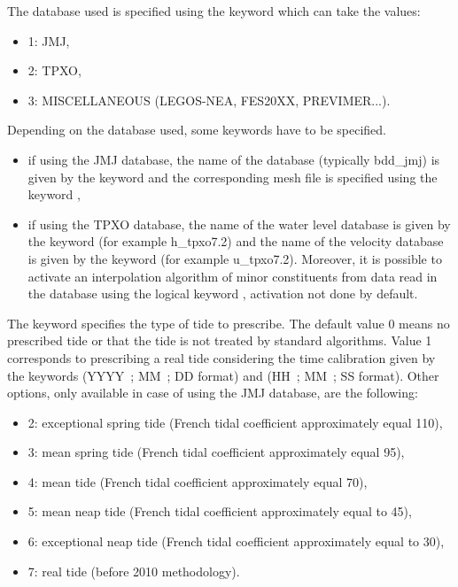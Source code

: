 The database used is specified using the keyword  which
can take the values:

\begin{itemize}
\item 1: JMJ,

\item 2: TPXO,

\item 3: MISCELLANEOUS (LEGOS-NEA, FES20XX, PREVIMER...).
\end{itemize}

Depending on the database used, some keywords have to be specified.

\begin{itemize}
\item if using the JMJ database, the name of the database (typically bdd\_jmj)
is given by the keyword  and the corresponding
mesh file is specified using the keyword ,

\item if using the TPXO database, the name of the water level database is given
by the keyword  (for example h\_tpxo7.2) and
the name of the velocity database is given by the keyword  (for example u\_tpxo7.2). Moreover, it is possible to
activate an interpolation algorithm of minor constituents from data read in the
database using the logical keyword ,
activation not done by default.
\end{itemize}

The keyword  specifies the type of tide to prescribe. The default value
0 means no prescribed tide or that the tide is not treated by standard
algorithms. Value 1 corresponds to prescribing a real tide considering the time
calibration given by the keywords  (YYYY~; MM~;
DD format) and  (HH~; MM~; SS format). Other
options, only available in case of using the JMJ database, are the following:

\begin{itemize}
\item 2: exceptional spring tide (French tidal coefficient approximately equal
110),

\item 3: mean spring tide (French tidal coefficient approximately equal 95),

\item 4: mean tide (French tidal coefficient approximately equal 70),

\item 5: mean neap tide (French tidal coefficient approximately equal to 45),

\item 6: exceptional neap tide (French tidal coefficient approximately equal
to 30),

\item 7: real tide (before 2010 methodology).
\end{itemize}

